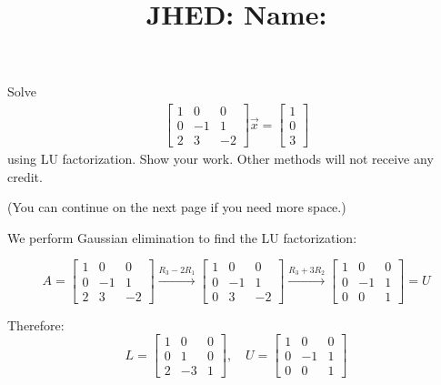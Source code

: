 \documentclass[reqno, answers]{exam}
\title{\normalsize{
  JHED: \underline{\hspace{4cm}} \hspace{1em} Name: \underline{\hspace{9cm}}}
   }
\author{}
\date{}
\begin{document}
\maketitle
\vspace{-2cm} %

\begin{questions}

  \question Solve 
  \begin{align*}
    \begin{bmatrix} 1 & 0 & 0 \\ 0 & -1 & 1 \\ 2 & 3 & -2 \end{bmatrix} \vec{x} = \begin{bmatrix} 1 \\ 0 \\ 3 \end{bmatrix}
  \end{align*}
  using LU factorization. Show your work. Other methods will not receive any credit.

  (You can continue on the next page if you need more space.)
  \begin{solution}
    We perform Gaussian elimination to find the LU factorization:
    
    $$A = \begin{bmatrix} 1 & 0 & 0 \\ 0 & -1 & 1 \\ 2 & 3 & -2 \end{bmatrix} \xrightarrow{R_3 - 2R_1} \begin{bmatrix} 1 & 0 & 0 \\ 0 & -1 & 1 \\ 0 & 3 & -2 \end{bmatrix} \xrightarrow{R_3 + 3R_2} \begin{bmatrix} 1 & 0 & 0 \\ 0 & -1 & 1 \\ 0 & 0 & 1 \end{bmatrix} = U$$

    Therefore:
    $$L = \begin{bmatrix} 1 & 0 & 0 \\ 0 & 1 & 0 \\ 2 & -3 & 1 \end{bmatrix}, \quad U = \begin{bmatrix} 1 & 0 & 0 \\ 0 & -1 & 1 \\ 0 & 0 & 1 \end{bmatrix}$$


\end{solution}
\end{questions}
\end{document}
